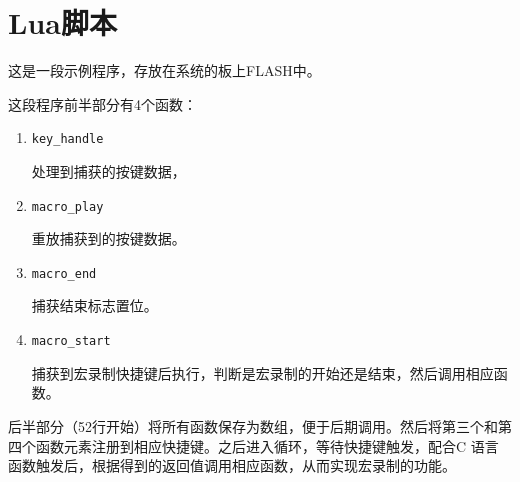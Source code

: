 \section{Lua脚本}

这是一段示例程序，存放在系统的板上FLASH中。

这段程序前半部分有4个函数：

\begin{enumerate}
\item \verb|key_handle|

处理到捕获的按键数据，
\item \verb|macro_play|

重放捕获到的按键数据。

\item \verb|macro_end|

捕获结束标志置位。

\item \verb|macro_start|

捕获到宏录制快捷键后执行，判断是宏录制的开始还是结束，然后调用相应函数。

\end{enumerate}

后半部分（52行开始）将所有函数保存为数组，便于后期调用。然后将第三个和第四个函数元素注册到相应快捷键。之后进入循环，等待快捷键触发，配合C 语言函数触发后，根据得到的返回值调用相应函数，从而实现宏录制的功能。







